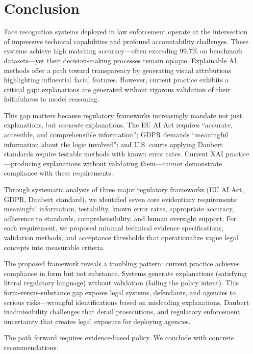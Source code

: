\section{Conclusion}

Face recognition systems deployed in law enforcement operate at the intersection of impressive technical capabilities and profound accountability challenges. These systems achieve high matching accuracy—often exceeding 99.7\% on benchmark datasets—yet their decision-making processes remain opaque. Explainable AI methods offer a path toward transparency by generating visual attributions highlighting influential facial features. However, current practice exhibits a critical gap: explanations are generated without rigorous validation of their faithfulness to model reasoning.

This gap matters because regulatory frameworks increasingly mandate not just explanations, but \emph{accurate} explanations. The EU AI Act requires ``accurate, accessible, and comprehensible information''; GDPR demands ``meaningful information about the logic involved''; and U.S. courts applying Daubert standards require testable methods with known error rates. Current XAI practice—producing explanations without validating them—cannot demonstrate compliance with these requirements.

Through systematic analysis of three major regulatory frameworks (EU AI Act, GDPR, Daubert standard), we identified seven core evidentiary requirements: meaningful information, testability, known error rates, appropriate accuracy, adherence to standards, comprehensibility, and human oversight support. For each requirement, we proposed minimal technical evidence specifications, validation methods, and acceptance thresholds that operationalize vague legal concepts into measurable criteria.

The proposed framework reveals a troubling pattern: current practice achieves compliance in form but not substance. Systems generate explanations (satisfying literal regulatory language) without validation (failing the policy intent). This form-versus-substance gap exposes legal systems, defendants, and agencies to serious risks—wrongful identifications based on misleading explanations, Daubert inadmissibility challenges that derail prosecutions, and regulatory enforcement uncertainty that creates legal exposure for deploying agencies.

The path forward requires evidence-based policy. We conclude with concrete recommendations:

